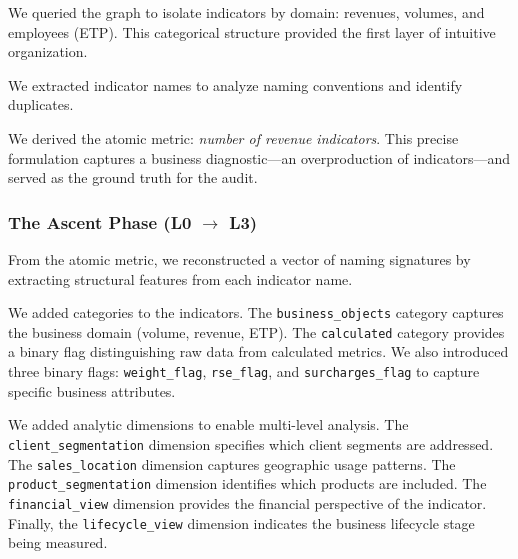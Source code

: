 \documentclass[Afour,times,sageh]{sagej}
\begin{document}
\vspace{1em}

We queried the graph to isolate indicators by domain: revenues, volumes, and employees (ETP). This categorical structure provided the first layer of intuitive organization.

\vspace{1em}

We extracted indicator names to analyze naming conventions and identify duplicates.

\vspace{1em}

We derived the atomic metric: \textit{number of revenue indicators}. This precise formulation captures a business diagnostic---an overproduction of indicators---and served as the ground truth for the audit.

\vspace{1em}


\subsubsection{The Ascent Phase (L0 $\to$ L3)}

\vspace{1em}

From the atomic metric, we reconstructed a vector of naming signatures by extracting structural features from each indicator name.

\vspace{1em}

We added categories to the indicators. The \texttt{business\_objects} category captures the business domain (volume, revenue, ETP). The \texttt{calculated} category provides a binary flag distinguishing raw data from calculated metrics. We also introduced three binary flags: \texttt{weight\_flag}, \texttt{rse\_flag}, and \texttt{surcharges\_flag} to capture specific business attributes.

\vspace{1em}

We added analytic dimensions to enable multi-level analysis. The \texttt{client\_segmentation} dimension specifies which client segments are addressed. The \texttt{sales\_location} dimension captures geographic usage patterns. The \texttt{product\_segmentation} dimension identifies which products are included. The \texttt{financial\_view} dimension provides the financial perspective of the indicator. Finally, the \texttt{lifecycle\_view} dimension indicates the business lifecycle stage being measured.
\end{document}
